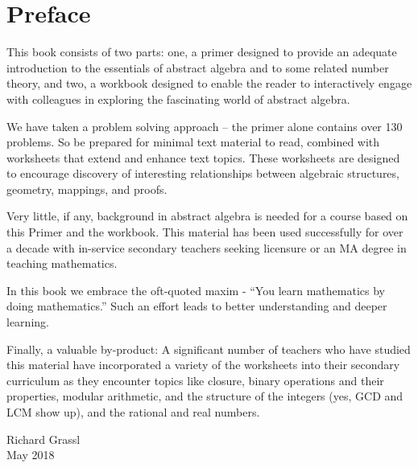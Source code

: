 
\section*{Preface}

This book consists of two parts: one, a primer designed to provide an adequate introduction to the essentials of abstract algebra and to some related number theory, and two, a workbook designed to enable the reader to interactively engage with colleagues in exploring the fascinating world of abstract algebra.

We have taken a problem solving approach -- the primer alone contains over 130 problems. So be prepared for minimal text material to read, combined with worksheets that extend and enhance text topics. These worksheets are designed to encourage discovery of interesting relationships between algebraic structures, geometry, mappings, and proofs.

Very little, if any, background in abstract algebra is needed for a course based on this Primer and the workbook. This material has been used successfully for over a decade with in-service secondary teachers seeking licensure or an MA degree in teaching mathematics.

In this book we embrace the oft-quoted maxim - ``You learn mathematics by doing mathematics.'' Such an effort leads to better understanding and deeper learning.

Finally, a valuable by-product: A significant number of teachers who have studied this material have incorporated a variety of the worksheets into their secondary curriculum as they encounter topics like closure, binary operations and their properties, modular arithmetic, and the structure of the integers (yes, GCD and LCM show up), and the rational and real numbers.


\begin{flushright}
  Richard Grassl\\
  May 2018
\end{flushright}


\cleardoublepage
